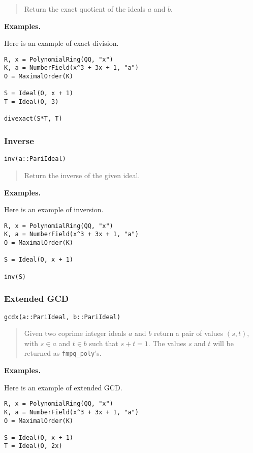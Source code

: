 \documentclass[a4paper,10pt]{article}
\newcommand{\code}{\lstinline}
\newcommand{\desc}[1]{\vspace{-3mm}\begin{quote}#1\end{quote}}
\begin{document}
{{\desc{Return the exact quotient of the ideals $a$ and $b$.}

\textbf{Examples.}

Here is an example of exact division.

\begin{lstlisting}
R, x = PolynomialRing(QQ, "x")
K, a = NumberField(x^3 + 3x + 1, "a")
O = MaximalOrder(K)

S = Ideal(O, x + 1)
T = Ideal(O, 3)

divexact(S*T, T)
\end{lstlisting}

\subsubsection{Inverse}

\begin{lstlisting}
inv(a::PariIdeal)
\end{lstlisting}

\desc{Return the inverse of the given ideal.}

\textbf{Examples.}

Here is an example of inversion.

\begin{lstlisting}
R, x = PolynomialRing(QQ, "x")
K, a = NumberField(x^3 + 3x + 1, "a")
O = MaximalOrder(K)

S = Ideal(O, x + 1)

inv(S)
\end{lstlisting}

\subsubsection{Extended GCD}

\begin{lstlisting}
gcdx(a::PariIdeal, b::PariIdeal)
\end{lstlisting}

\desc{Given two coprime integer ideals $a$ and $b$ return a pair of values $(s, t)$,
with $s \in a$ and $t \in b$ such that $s + t = 1$. The values $s$ and $t$ will be
returned as \code{fmpq_poly}'s.}

\textbf{Examples.}

Here is an example of extended GCD.

\begin{lstlisting}
R, x = PolynomialRing(QQ, "x")
K, a = NumberField(x^3 + 3x + 1, "a")
O = MaximalOrder(K)

S = Ideal(O, x + 1)
T = Ideal(O, 2x)


\end{lstlisting}}}
\end{document}
